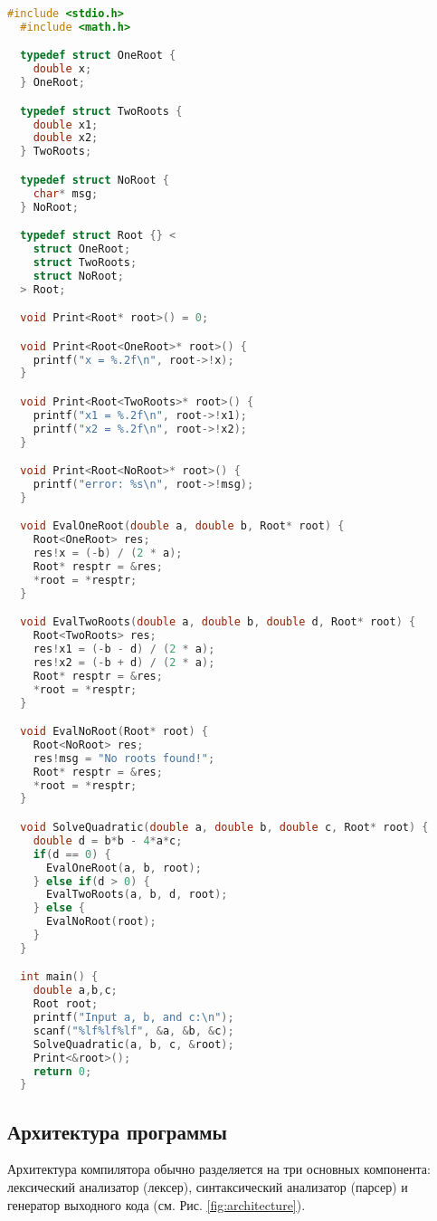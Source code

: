 \begin{lstlisting}[language=c, caption={Пример программы, которая находит корни квадратного уравнения}, label={lst:exampleroots}]
  #include <stdio.h>
  #include <math.h>

  typedef struct OneRoot {
    double x;
  } OneRoot;

  typedef struct TwoRoots {
    double x1;
    double x2;
  } TwoRoots;

  typedef struct NoRoot {
    char* msg;
  } NoRoot;

  typedef struct Root {} <
    struct OneRoot;
    struct TwoRoots;
    struct NoRoot;
  > Root;

  void Print<Root* root>() = 0;

  void Print<Root<OneRoot>* root>() {
    printf("x = %.2f\n", root->!x);
  }

  void Print<Root<TwoRoots>* root>() {
    printf("x1 = %.2f\n", root->!x1);
    printf("x2 = %.2f\n", root->!x2);
  }

  void Print<Root<NoRoot>* root>() {
    printf("error: %s\n", root->!msg);
  }

  void EvalOneRoot(double a, double b, Root* root) {
    Root<OneRoot> res;
    res!x = (-b) / (2 * a);
    Root* resptr = &res;
    *root = *resptr;
  }

  void EvalTwoRoots(double a, double b, double d, Root* root) {
    Root<TwoRoots> res;
    res!x1 = (-b - d) / (2 * a);
    res!x2 = (-b + d) / (2 * a);
    Root* resptr = &res;
    *root = *resptr;
  }

  void EvalNoRoot(Root* root) {
    Root<NoRoot> res;
    res!msg = "No roots found!";
    Root* resptr = &res;
    *root = *resptr;
  }

  void SolveQuadratic(double a, double b, double c, Root* root) {
    double d = b*b - 4*a*c;
    if(d == 0) {
      EvalOneRoot(a, b, root);
    } else if(d > 0) {
      EvalTwoRoots(a, b, d, root);
    } else {
      EvalNoRoot(root);
    }
  }

  int main() {
    double a,b,c;
    Root root;
    printf("Input a, b, and c:\n");
    scanf("%lf%lf%lf", &a, &b, &c);
    SolveQuadratic(a, b, c, &root);
    Print<&root>();
    return 0;
  }
\end{lstlisting}

\subsection{Архитектура программы}

Архитектура компилятора обычно разделяется на три основных компонента: лексический анализатор (лексер), синтаксический анализатор (парсер) и генератор выходного кода (см. Рис. \ref{fig:architecture}).

